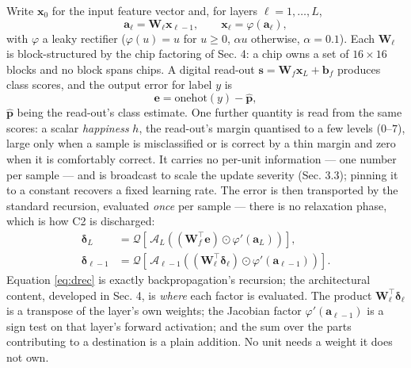 \documentclass[11pt]{article}
\newcommand{\W}{\bm W}
\newcommand{\x}{\bm x}
\newcommand{\bdelta}{\bm\delta}
\begin{document}
Write \(\bm x_0\) for the input feature vector and, for layers
\(\ell = 1,\dots,L\),
\begin{equation}
\bm a_\ell = \W_\ell \x_{\ell-1}, \qquad \x_\ell = \varphi(\bm a_\ell),
\end{equation}
with \(\varphi\) a leaky rectifier (\(\varphi(u) = u\) for \(u \ge 0\),
\(\alpha u\) otherwise, \(\alpha = 0.1\)). Each \(\bm W_\ell\) is
block-structured by the chip factoring of Sec. 4: a chip owns a set of
\(16\times16\) blocks and no block spans chips. A digital read-out
\(\bm s = \bm W_f \bm x_L + \bm b_f\) produces class scores, and the
output error for label \(y\) is
\begin{equation}
\bm e = \mathrm{onehot}(y) - \hat{\bm p},
\end{equation} \(\hat{\bm p}\) being the
read-out's class estimate. One further quantity is read from the same
scores: a scalar \emph{happiness} \(h\), the read-out's margin quantised
to a few levels (\(0\)--\(7\)), large only when a sample is
misclassified or is correct by a thin margin and zero when it is
comfortably correct. It carries no per-unit information --- one number
per sample --- and is broadcast to scale the update severity (Sec. 3.3);
pinning it to a constant recovers a fixed learning rate. The error is
then transported by the standard recursion, evaluated \emph{once} per
sample --- there is no relaxation phase, which is how C2 is discharged:
\begin{align}
\bdelta_L &= \mathcal{Q}\!\left[\,\mathcal{A}_L\!\left((\W_f^{\!\top}\bm e)\odot\varphi'(\bm a_L)\right)\right],\label{eq:dL}\\
\bdelta_{\ell-1} &= \mathcal{Q}\!\left[\,\mathcal{A}_{\ell-1}\!\left((\W_\ell^{\!\top}\bdelta_\ell)\odot\varphi'(\bm a_{\ell-1})\right)\right].\label{eq:drec}
\end{align} Equation \eqref{eq:drec} is exactly backpropagation's recursion; the
architectural content, developed in Sec. 4, is \emph{where} each factor
is evaluated. The product \(\bm W_\ell^{\!\top}\bm\delta_\ell\) is a
transpose of the layer's own weights; the Jacobian factor
\(\varphi'(\bm a_{\ell-1})\) is a sign test on that layer's forward
activation; and the sum over the parts contributing to a destination is
a plain addition. No unit needs a weight it does not own.
\end{document}
